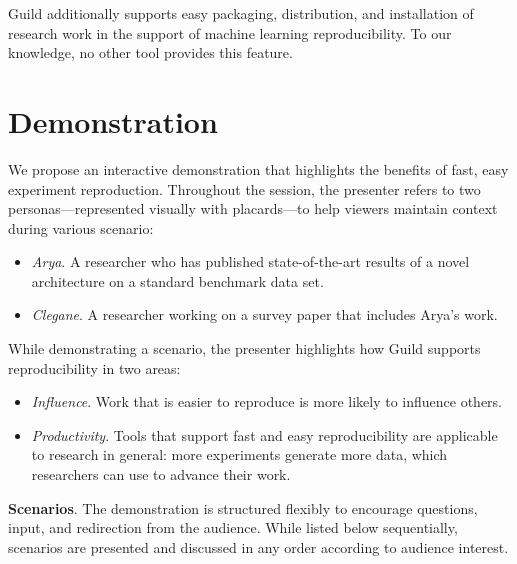 \documentclass{article}
\begin{document}
Guild additionally supports easy packaging, distribution, and
installation of research work in the support of machine learning
reproducibility. To our knowledge, no other tool provides this
feature.

\section{Demonstration}

We propose an interactive demonstration that highlights the benefits
of fast, easy experiment reproduction. Throughout the session, the
presenter refers to two personas---represented visually with
placards---to help viewers maintain context during various scenario:

\begin{itemize}[topsep=0pt, itemsep=0pt]
\item \emph{Arya}. A researcher who has published state-of-the-art
  results of a novel architecture on a standard benchmark data set.
\item \emph{Clegane}. A researcher working on a survey paper that
  includes Arya's work.
\end{itemize}

While demonstrating a scenario, the presenter highlights how Guild
supports reproducibility in two areas:

\begin{itemize}[topsep=0pt, itemsep=0pt]
\item \emph{Influence}. Work that is easier to reproduce is more
  likely to influence others.

\item \emph{Productivity}. Tools that support fast and easy
  reproducibility are applicable to research in general: more
  experiments generate more data, which researchers can use to advance
  their work.
\end{itemize}

\textbf{Scenarios}. The demonstration is structured flexibly to
encourage questions, input, and redirection from the audience. While
listed below sequentially, scenarios are presented and discussed in
any order according to audience interest.
\end{document}
